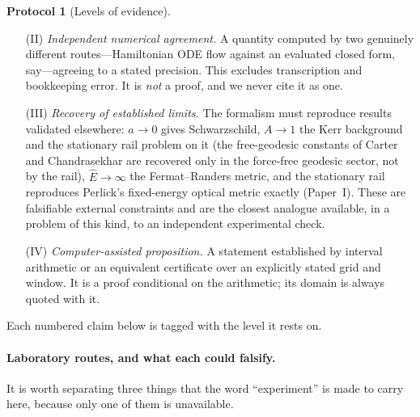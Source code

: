 \documentclass[12pt]{iopart}
\theoremstyle{plain}
\theoremstyle{definition}
\newtheorem{protocol}{Protocol}
\theoremstyle{remark}
\newcommand{\Ehat}{\hat E}
\begin{document}
\begin{protocol}[Levels of evidence]
\begin{enumerate}
The identities carrying two independent routes are those of
Propositions~\ref{prop:classification} and~\ref{prop:exterior-sep} and of
section~\ref{sec:submersion}: the factorisation~\eqref{eq:marginal-factor} and the
multiplicity of the root it produces, the cusp amplitude~\eqref{eq:cusp}, the
one-sided tangent~\eqref{eq:corner-slope}, the tension
field~\eqref{eq:tension-residual}, the coefficients of the optical-curvature
expansion, and the Vaidya--Kodama relations of Paper~I. These are checked in
Mathematica by the scripts named with each claim and, independently, in SymPy by
\texttt{verification/verify\_independent\_rederivation.py}, which rebuilds every
quantity from the definitions printed here rather than from the Mathematica scripts
it cross-checks, so that agreement is evidence and not tautology.
\item[\rm(II)] \emph{Independent numerical agreement.} A quantity computed by
two genuinely different routes---Hamiltonian ODE flow against an evaluated
closed form, say---agreeing to a stated precision. This excludes transcription
and bookkeeping error. It is \emph{not} a proof, and we never cite it as one.
\item[\rm(III)] \emph{Recovery of established limits.} The formalism must
reproduce results validated elsewhere: $a\to0$ gives Schwarzschild, $A\to1$ the
Kerr background and the stationary rail problem on it (the free-geodesic constants of
Carter and Chandrasekhar \cite{Carter1968,Chandrasekhar} are recovered only in the
force-free geodesic sector, not by the rail), $\Ehat\to\infty$ the Fermat--Randers metric,
and the stationary rail reproduces Perlick's fixed-energy optical metric
\cite{Perlick1991} exactly (Paper~I). These are falsifiable external constraints
and are the closest analogue available, in a problem of this kind, to an
independent experimental check.
\item[\rm(IV)] \emph{Computer-assisted proposition.} A statement established by
interval arithmetic or an equivalent certificate over an explicitly stated grid
and window. It is a proof conditional on the arithmetic; its domain is always
quoted with it.
\end{enumerate}
Each numbered claim below is tagged with the level it rests on.
\end{protocol}

\paragraph{Laboratory routes, and what each could falsify.} It is worth separating
three things that the word ``experiment'' is made to carry here, because only one of
them is unavailable.
\end{document}
